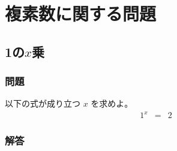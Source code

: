 \section{複素数に関する問題}
\label{s:複素数}

\subsection{1の$x$乗}
\label{ssec:複素数:1のx乗}
\subsubsection{問題}
\label{sssec:複素数:1のx乗:問題}

以下の式が成り立つ $x$ を求めよ。
  \begin{eqnarray}
    1^x & = & 2
  \end{eqnarray}


\clearpage
\subsubsection{解答}
\label{sssec:複素数:1のx乗:解答}

